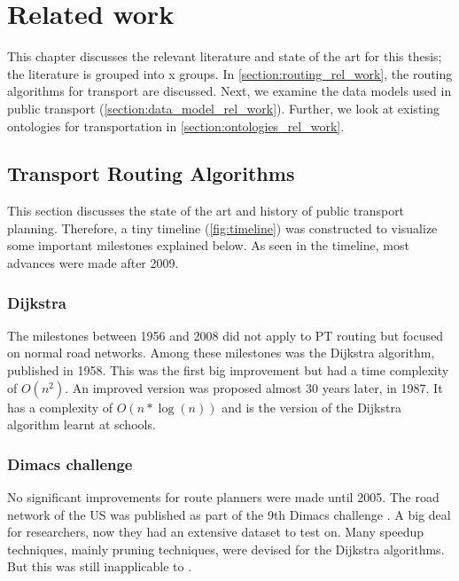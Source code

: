 \chapter{Related work}
\label{chap:rel_work}
This chapter discusses the relevant literature and state of the art for this thesis; the literature is grouped into x groups. In \autoref{section:routing_rel_work}, the routing algorithms for transport are discussed. Next, we examine the data models used in public transport (\autoref{section:data_model_rel_work}). Further, we look at existing ontologies for transportation in \autoref{section:ontologies_rel_work}.

\section{Transport Routing Algorithms }\label{section:routing_rel_work}



This section discusses the state of the art and history of public transport planning. Therefore, a tiny timeline (\autoref{fig:timeline}) was constructed to visualize some important milestones explained below. As seen in the timeline, most advances were made after 2009.

\subsection{Dijkstra}
The milestones between 1956 and 2008 did not apply to PT routing but focused on normal road networks. Among these milestones was the Dijkstra algorithm, published in 1958. This was the first big improvement but had a time complexity of $O(n^2)$. An improved version was proposed almost 30 years later, in 1987. It has a complexity of $O(n*\log(n))$ and is the version of the Dijkstra algorithm learnt at schools.%
\subsection{Dimacs challenge}
No significant improvements for route planners were made until 2005. The road network of the US was published as part of the 9th Dimacs challenge \cite{noauthor_9th_2017}. A big deal for researchers, now they had an extensive dataset to test on. Many speedup techniques, mainly pruning techniques, were devised for the Dijkstra algorithms. But this was still inapplicable to .

